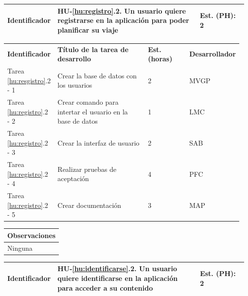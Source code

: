\documentclass[11pt]{article}
\begin{document}
\centering
\begin{longtable}{p{0.18\linewidth}|p{0.6\linewidth}|p{0.2\linewidth}}
	\toprule
	\toprule
	\textbf{Identificador} & \textbf{HU-\ref{hu:registro}.2}. Un usuario quiere registrarse en la aplicación para poder planificar su viaje & \textbf{Est. (PH):} 2 \\
	
	\bottomrule
\end{longtable}

\begin{longtable}{p{0.18\linewidth}|p{0.4\linewidth}|p{0.18\linewidth}|p{0.2\linewidth}}
	\toprule
	\textbf{Identificador} & \textbf{Título de la tarea de desarrollo} & \textbf{Est. (horas)} & \textbf{Desarrollador} \\
        Tarea \ref{hu:resgistro}.2 - 1 & Crear la base de datos con los usuarios & 2 & MVGP\\
        Tarea \ref{hu:registro}.2 - 2 & Crear comando para intertar el usuario en la base de datos & 1 & LMC\\
        Tarea \ref{hu:registro}.2 - 3 & Crear la interfaz de usuario & 2 & SAB\\
        Tarea \ref{hu:registro}.2 - 4 & Realizar pruebas de aceptación & 4 & PFC \\
       	Tarea \ref{hu:registro}.2 - 5 & Crear documentación & 3 & MAP\\
	\bottomrule
\end{longtable}





\begin{longtable}{p{1.028\linewidth}}
	\textbf{Observaciones}\\
	\midrule
	Ninguna\\
	\bottomrule
	\bottomrule
\end{longtable}


\centering
\begin{longtable}{p{0.18\linewidth}|p{0.6\linewidth}|p{0.2\linewidth}}
	\toprule
	\toprule
	\textbf{Identificador} & \textbf{HU-\ref{hu:identificarse}.2}. Un usuario quiere identificarse en la aplicación para acceder a su contenido & \textbf{Est. (PH):} 2 \\
	
	\bottomrule
\end{longtable}
\end{document}
